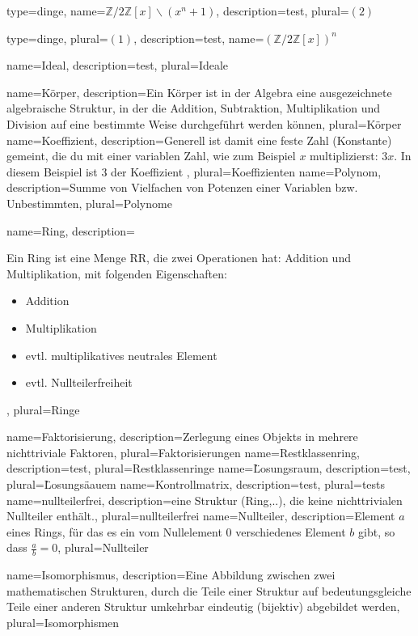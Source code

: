 {
    type=dinge,
    name={$\mathbb{Z} / 2 \mathbb{Z}[x]\backslash (x^n + 1)$},
    description={test},
    plural={$(2)$}
}

{
    type=dinge,
    plural={$(1)$},
    description={test},
    name={$(\mathbb{Z} / 2 \mathbb{Z}[x])^n$}
}

{
    name={Ideal},
    description={test},
    plural={Ideale}
}

{
    name={Körper},
    description={Ein Körper ist in der Algebra eine ausgezeichnete algebraische Struktur, in der die Addition, Subtraktion, Multiplikation und Division auf eine bestimmte Weise durchgeführt werden können},
    plural={Körper}
}
{
    name={Koeffizient},
    description={Generell ist damit eine feste Zahl (Konstante) gemeint, die du mit einer variablen Zahl, wie zum Beispiel $x$ multiplizierst: $3x$. In diesem Beispiel ist $3$ der Koeffizient },
    plural={Koeffizienten}
} 
{
    name={Polynom},
    description={Summe von Vielfachen von Potenzen einer Variablen bzw. Unbestimmten},
    plural={Polynome}
}
{
    name={Ring},
    description={Ein Ring ist eine Menge RR, die zwei Operationen hat: Addition und Multiplikation, mit folgenden Eigenschaften: \begin{itemize}
        \item Addition
        \item Multiplikation
        \item evtl. multiplikatives neutrales Element
        \item evtl. Nullteilerfreiheit
    \end{itemize}},
    plural={Ringe}
}
{
    name={Faktorisierung},
    description={Zerlegung eines Objekts in mehrere nichttriviale Faktoren},
    plural={Faktorisierungen}
}
{
    name={Restklassenring},
    description={test},
    plural={Restklassenringe}
} 
{
    name={L̈osungsraum},
    description={test},
    plural={L̈osungsäauem}
}
{
    name={Kontrollmatrix},
    description={test},
    plural={tests}
}
{
    name={nullteilerfrei},
    description={eine Struktur (Ring,..), die keine nichttrivialen \gls{Nullteiler} enthält.},
    plural={nullteilerfrei}
}
{
    name={Nullteiler},
    description={Element $a$ eines Rings, für das es ein vom Nullelement 0 verschiedenes Element $b$ gibt, so dass $\frac{a}{b} = 0$},
    plural={Nullteiler}
}

{
    name={Isomorphismus},
    description={Eine Abbildung zwischen zwei mathematischen Strukturen, durch die Teile einer Struktur auf bedeutungsgleiche Teile einer anderen Struktur umkehrbar eindeutig (bijektiv) abgebildet werden},
    plural={Isomorphismen}
}